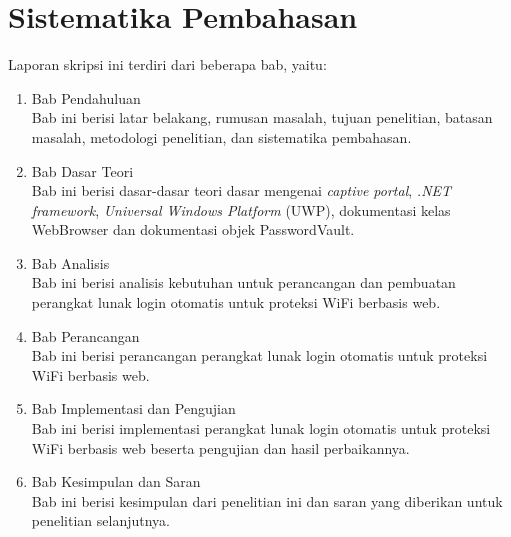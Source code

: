 \section{Sistematika Pembahasan}
\label{sec:sistematika_pembahasan}

Laporan skripsi ini terdiri dari beberapa bab, yaitu:

\begin{enumerate}
    \item{Bab Pendahuluan \\ Bab ini berisi latar belakang, rumusan masalah, tujuan penelitian, batasan masalah, metodologi penelitian, dan sistematika pembahasan.}
    \item{Bab Dasar Teori \\ Bab ini berisi dasar-dasar teori dasar mengenai \textit{captive portal}, \textit{.NET framework}, \textit{Universal Windows Platform} (UWP), dokumentasi kelas WebBrowser dan dokumentasi objek PasswordVault.}
    \item{Bab Analisis \\ Bab ini berisi analisis kebutuhan untuk perancangan dan pembuatan perangkat lunak login otomatis untuk proteksi WiFi berbasis web.}
    \item{Bab Perancangan \\ Bab ini berisi perancangan perangkat lunak login otomatis untuk proteksi WiFi berbasis web.}
    \item{Bab Implementasi dan Pengujian \\ Bab ini berisi implementasi perangkat lunak login otomatis untuk proteksi WiFi berbasis web beserta pengujian dan hasil perbaikannya.}
    \item{Bab Kesimpulan dan Saran \\ Bab ini berisi kesimpulan dari penelitian ini dan saran yang diberikan untuk penelitian selanjutnya.}
\end{enumerate}
